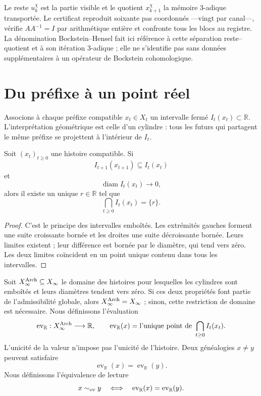 Le reste \(u_k^\chi\) est la partie visible et le quotient
\(x_{k+1}^\chi\) la mémoire 3-adique transportée. Le certificat reproduit
soixante pas coordonnés ---vingt par canal---, vérifie \(AA^{-1}=I\) par
arithmétique entière et confronte tous les blocs au registre. La dénomination
Bockstein--Hensel fait ici référence à cette séparation reste--quotient et à son
itération 3-adique ; elle ne s'identifie pas sans données supplémentaires à un opérateur de
Bockstein cohomologique.

\section{Du préfixe à un point réel}

Associons à chaque préfixe compatible \(x_t\in X_t\) un intervalle fermé
\(I_t(x_t)\subset\mathbb R\). L'interprétation géométrique est celle d'un
cylindre : tous les futurs qui partagent le même préfixe se projettent à l'intérieur
de \(I_t\).

\begin{theorem}
Soit \((x_t)_{t\ge0}\) une histoire compatible. Si
\[
I_{t+1}(x_{t+1})\subseteq I_t(x_t)
\]
et
\[
\operatorname{diam} I_t(x_t)\longrightarrow0,
\]
alors il existe un unique \(r\in\mathbb R\) tel que
\[
\bigcap_{t\ge0}I_t(x_t)=\{r\}.
\]
\end{theorem}

\begin{proof}
C'est le principe des intervalles emboîtés. Les extrémités gauches forment une
suite croissante bornée et les droites une suite décroissante bornée. Leurs limites
existent ; leur différence est bornée par le diamètre, qui tend vers
zéro. Les deux limites coïncident en un point unique contenu dans tous les
intervalles.
\end{proof}

Soit \(X_\infty^{\rm Arch}\subseteq X_\infty\) le domaine des histoires pour
lesquelles les cylindres sont emboîtés et leurs diamètres tendent vers zéro. Si ces
deux propriétés font partie de l'admissibilité globale, alors
\(X_\infty^{\rm Arch}=X_\infty\) ; sinon, cette restriction de domaine est
nécessaire. Nous définissons l'évaluation
\[
\operatorname{ev}_{\mathbb R}:X_\infty^{\rm Arch}\longrightarrow\mathbb R,
\qquad
\operatorname{ev}_{\mathbb R}(x)=
\text{l’unique point de }\bigcap_{t\ge0}I_t(x_t).
\]
L'unicité de la valeur n'impose pas l'unicité de l'histoire. Deux généalogies
\(x\ne y\) peuvent satisfaire
\[
\operatorname{ev}_{\mathbb R}(x)
=\operatorname{ev}_{\mathbb R}(y).
\]
Nous définissons l'équivalence de lecture
\[
x\sim_{\rm ev}y
\quad\Longleftrightarrow\quad
\operatorname{ev}_{\mathbb R}(x)
=\operatorname{ev}_{\mathbb R}(y).
\]

